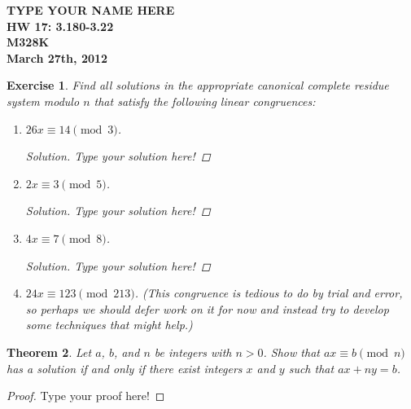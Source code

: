 \documentclass[12pt,leqno]{article}
\numberwithin{equation}{section}
\newtheorem{thm}{Theorem}[section]
\newtheorem{exer}[thm]{Exercise}
\theoremstyle{definition}
\begin{document}
\thispagestyle{plain}
\begin{flushright}
\large{\textbf{TYPE YOUR NAME HERE \\
HW 17: 3.180-3.22\\
M328K \\
March 27th, 2012 \\}}
\end{flushright}

\markboth{}{} \setcounter{section}{0} \baselineskip=18pt

\setcounter{tocdepth}{4}



\setcounter{section}{3}

\setcounter{thm}{17}

\begin{exer}
Find all solutions in the appropriate canonical complete residue
system modulo $n$ that satisfy the following linear congruences:
\begin{enumerate}
\item $26x \equiv 14 \pmod{3}$.
\begin{proof}[Solution]
Type your solution here!
\end{proof}
\item $2x \equiv 3 \pmod{5}$.
\begin{proof}[Solution]
Type your solution here!
\end{proof}
\item $4x \equiv 7 \pmod{8}$.
\begin{proof}[Solution]
Type your solution here!
\end{proof}
\item $24x \equiv 123 \pmod{213}$. (This congruence is tedious to do by
trial and error, so perhaps we should defer work on it for now and
instead try to develop some techniques that might help.)
\end{enumerate}
\end{exer}

\begin{thm}
Let $a$, $b$, and $n$ be integers with $n > 0$.  Show that $ax
\equiv b \pmod{n}$ has a solution if and only if there exist
integers $x$ and $y$ such that $ax + ny = b$.
\end{thm}
\begin{proof}[Proof]
Type your proof here!
\end{proof}
\end{document}
